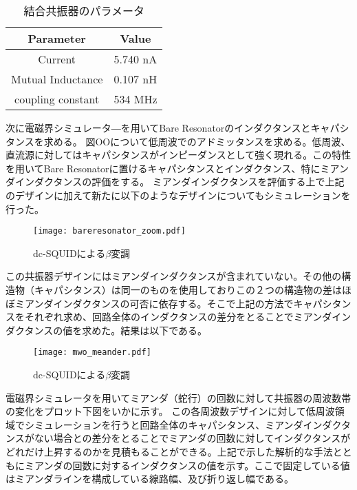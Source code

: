         \begin{table}[h]
            \caption{結合共振器のパラメータ}
            \centering
            \begin{tabular}{@{}cc@{}}
            \toprule
            Parameter & Value    \\ 
            \hline \hline
            Current        & 5.740 nA \\
            Mutual Inductance       & 0.107 nH \\ 
            coupling constant         & 534 MHz  \\\bottomrule
            
            \end{tabular}
            \end{table}
        次に電磁界シミュレータ―を用いてBare Resonatorのインダクタンスとキャパシタンスを求める。
        図OOについて低周波でのアドミッタンスを求める。低周波、直流源に対してはキャパシタンスがインピーダンスとして強く現れる。この特性を用いてBare Resonatorに置けるキャパシタンスとインダクタンス、特にミアンダインダクタンスの評価をする。
        ミアンダインダクタンスを評価する上で上記のデザインに加えて新たに以下のようなデザインについてもシミュレーションを行った。
        \begin{figure}[H]
            \centering
            \texttt{[image: bareresonator\_zoom.pdf]}
            \caption{dc-SQUIDによる$\beta$変調}
        \end{figure}
        この共振器デザインにはミアンダインダクタンスが含まれていない。その他の構造物（キャパシタンス）は同一のものを使用しておりこの２つの構造物の差はほぼミアンダインダクタンスの可否に依存する。そこで上記の方法でキャパシタンスをそれぞれ求め、回路全体のインダクタンスの差分をとることでミアンダインダクタンスの値を求めた。結果は以下である。
        \begin{figure}[H]
            \centering
            \texttt{[image: mwo\_meander.pdf]}
            \caption{dc-SQUIDによる$\beta$変調}
        \end{figure}
        電磁界シミュレータを用いてミアンダ（蛇行）の回数に対して共振器の周波数帯の変化をプロット下図をいかに示す。
        この各周波数デザインに対して低周波領域でシミュレーションを行うと回路全体のキャパシタンス、ミアンダインダクタンスがない場合との差分をとることでミアンダの回数に対してインダクタンスがどれだけ上昇するのかを見積もることができる。上記で示した解析的な手法とともにミアンダの回数に対するインダクタンスの値を示す。ここで固定している値はミアンダラインを構成している線路幅、及び折り返し幅である。
